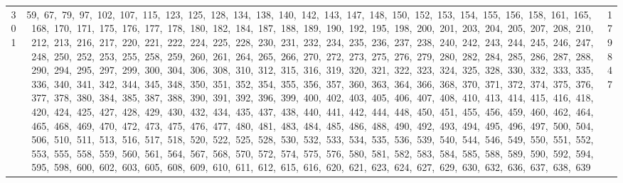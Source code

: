 \begin{longtable}{c|p{}|r}
301 & 59,\ 67,\ 79,\ 97,\ 102,\ 107,\ 115,\ 123,\ 125,\ 128,\ 134,\ 138,\ 140,\ 142,\ 143,\ 147,\ 148,\ 150,\ 152,\ 153,\ 154,\ 155,\ 156,\ 158,\ 161,\ 165,\ 168,\ 170,\ 171,\ 175,\ 176,\ 177,\ 178,\ 180,\ 182,\ 184,\ 187,\ 188,\ 189,\ 190,\ 192,\ 195,\ 198,\ 200,\ 201,\ 203,\ 204,\ 205,\ 207,\ 208,\ 210,\ 212,\ 213,\ 216,\ 217,\ 220,\ 221,\ 222,\ 224,\ 225,\ 228,\ 230,\ 231,\ 232,\ 234,\ 235,\ 236,\ 237,\ 238,\ 240,\ 242,\ 243,\ 244,\ 245,\ 246,\ 247,\ 248,\ 250,\ 252,\ 253,\ 255,\ 258,\ 259,\ 260,\ 261,\ 264,\ 265,\ 266,\ 270,\ 272,\ 273,\ 275,\ 276,\ 279,\ 280,\ 282,\ 284,\ 285,\ 286,\ 287,\ 288,\ 290,\ 294,\ 295,\ 297,\ 299,\ 300,\ 304,\ 306,\ 308,\ 310,\ 312,\ 315,\ 316,\ 319,\ 320,\ 321,\ 322,\ 323,\ 324,\ 325,\ 328,\ 330,\ 332,\ 333,\ 335,\ 336,\ 340,\ 341,\ 342,\ 344,\ 345,\ 348,\ 350,\ 351,\ 352,\ 354,\ 355,\ 356,\ 357,\ 360,\ 363,\ 364,\ 366,\ 368,\ 370,\ 371,\ 372,\ 374,\ 375,\ 376,\ 377,\ 378,\ 380,\ 384,\ 385,\ 387,\ 388,\ 390,\ 391,\ 392,\ 396,\ 399,\ 400,\ 402,\ 403,\ 405,\ 406,\ 407,\ 408,\ 410,\ 413,\ 414,\ 415,\ 416,\ 418,\ 420,\ 424,\ 425,\ 427,\ 428,\ 429,\ 430,\ 432,\ 434,\ 435,\ 437,\ 438,\ 440,\ 441,\ 442,\ 444,\ 448,\ 450,\ 451,\ 455,\ 456,\ 459,\ 460,\ 462,\ 464,\ 465,\ 468,\ 469,\ 470,\ 472,\ 473,\ 475,\ 476,\ 477,\ 480,\ 481,\ 483,\ 484,\ 485,\ 486,\ 488,\ 490,\ 492,\ 493,\ 494,\ 495,\ 496,\ 497,\ 500,\ 504,\ 506,\ 510,\ 511,\ 513,\ 516,\ 517,\ 518,\ 520,\ 522,\ 525,\ 528,\ 530,\ 532,\ 533,\ 534,\ 535,\ 536,\ 539,\ 540,\ 544,\ 546,\ 549,\ 550,\ 551,\ 552,\ 553,\ 555,\ 558,\ 559,\ 560,\ 561,\ 564,\ 567,\ 568,\ 570,\ 572,\ 574,\ 575,\ 576,\ 580,\ 581,\ 582,\ 583,\ 584,\ 585,\ 588,\ 589,\ 590,\ 592,\ 594,\ 595,\ 598,\ 600,\ 602,\ 603,\ 605,\ 608,\ 609,\ 610,\ 611,\ 612,\ 615,\ 616,\ 620,\ 621,\ 623,\ 624,\ 627,\ 629,\ 630,\ 632,\ 636,\ 637,\ 638,\ 639 & 179847 \\

\end{longtable}
